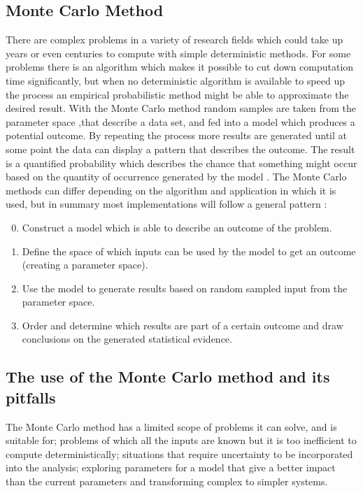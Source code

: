 \subsection{Monte Carlo Method}
There are complex problems in a variety of research fields which could take up years or even centuries to compute with simple deterministic methods. For some problems there is an algorithm which makes it possible to cut down computation time significantly, but when no deterministic algorithm is available to speed up the process an empirical probabilistic method might be able to approximate the desired result. With the Monte Carlo method random samples are taken from the parameter space ,that describe a data set, and fed into a model which produces a potential outcome. By repeating the process more results are generated until at some point the data can display a pattern that describes the outcome. The result is a quantified probability which describes the chance that something might occur based on the quantity of occurrence generated by the model \cite{}.
\newline
\newline
The Monte Carlo methods can differ depending on the algorithm and application in which it is used, but in summary most implementations will follow a general pattern \cite{}:
\begin{enumerate}
	\setcounter{enumi}{-1}
	\item Construct a model which is able to describe an outcome of the problem.
	\item Define the space of which inputs can be used by the model to get an outcome (creating a parameter space). 
	\item Use the model to generate results based on random sampled input from the parameter space.
	\item Order and determine which results are part of a certain outcome and draw conclusions on the generated statistical evidence.
\end{enumerate}

\label{subsec:Monte_Carlo_Method}

\subsection{The use of the Monte Carlo method and its pitfalls}
The Monte Carlo method has a limited scope of problems it can solve, and is suitable for; problems of which all the inputs are known but it is too inefficient to compute deterministically; situations that require uncertainty to be incorporated into the analysis; exploring parameters for a model that give a better impact than the current parameters and transforming complex to simpler systems. 

